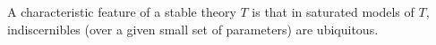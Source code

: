 A characteristic feature of a stable theory $T$ is that in saturated models of $T$, indiscernibles (over a given small set of parameters) are ubiquitous.
